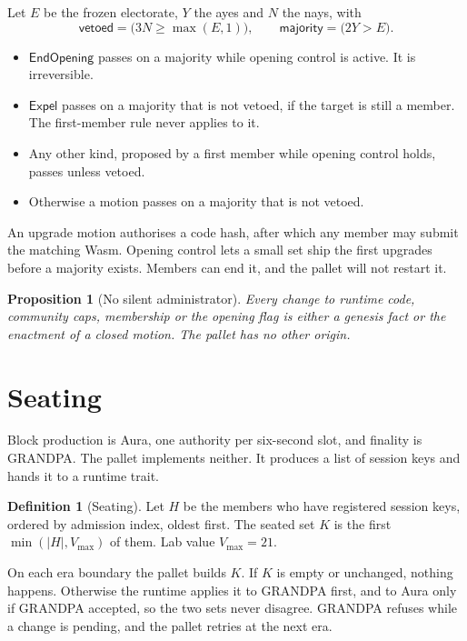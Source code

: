 \documentclass[11pt,a4paper]{article}
\theoremstyle{definition}
\newtheorem{definition}{Definition}[section]
\theoremstyle{plain}
\newtheorem{proposition}{Proposition}[section]
\theoremstyle{remark}
\begin{document}
Let $E$ be the frozen electorate, $Y$ the ayes and $N$ the nays, with
\[
  \mathsf{vetoed} = \bigl(3N \ge \max(E, 1)\bigr), \qquad \mathsf{majority} = \bigl(2Y > E\bigr).
\]

\begin{itemize}
  \item $\mathsf{EndOpening}$ passes on a majority while opening control is active. It is irreversible.
  \item $\mathsf{Expel}$ passes on a majority that is not vetoed, if the target is still a member. The first-member rule never applies to it.
  \item Any other kind, proposed by a first member while opening control holds, passes unless vetoed.
  \item Otherwise a motion passes on a majority that is not vetoed.
\end{itemize}

An upgrade motion authorises a code hash, after which any member may submit the matching Wasm. Opening control lets a small set ship the first upgrades before a majority exists. Members can end it, and the pallet will not restart it.

\begin{proposition}[No silent administrator]
Every change to runtime code, community caps, membership or the opening flag is either a genesis fact or the enactment of a closed motion. The pallet has no other origin.
\end{proposition}

\section{Seating}
\label{sec:seating}

Block production is Aura, one authority per six-second slot, and finality is GRANDPA. The pallet implements neither. It produces a list of session keys and hands it to a runtime trait.

\begin{definition}[Seating]
Let $H$ be the members who have registered session keys, ordered by admission index, oldest first. The seated set $K$ is the first $\min(|H|, V_{\max})$ of them. Lab value $V_{\max} = 21$.
\end{definition}

On each era boundary the pallet builds $K$. If $K$ is empty or unchanged, nothing happens. Otherwise the runtime applies it to GRANDPA first, and to Aura only if GRANDPA accepted, so the two sets never disagree. GRANDPA refuses while a change is pending, and the pallet retries at the next era.
\end{document}
